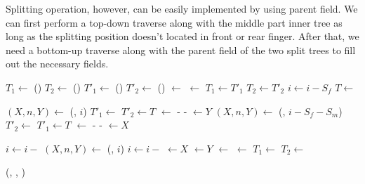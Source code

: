 \documentclass[b5paper]{article}
\begin{document}
Splitting operation, however, can be easily implemented by using parent field. We can first
perform a top-down traverse along with the middle part inner tree as long as the splitting position
doesn't located in front or rear finger. After that, we need a bottom-up traverse along
with the parent field of the two split trees to fill out the necessary fields.

\begin{algorithmic}
  \State $T_1 \gets$ ()
  \State $T_2 \gets$ ()
   
    \State $T'_1 \gets$ ()
    \State $T'_2 \gets$ ()
    \State {} $\gets$ 
    \State {} $\gets$ 
    \State {}
    \State {}
    \State $T_1 \gets T'_1$
    \State $T_2 \gets T'_2$
    \State $i \gets i - S_f$
    \State $T \gets$ 
  \EndWhile

    \State $(X, n, Y) \gets$ (, $i$)
    \State $T'_1 \gets$ 
    \State $T'_2 \gets T$
    \State {} $\gets$  -  - 
    \State {} $\gets Y$
    \State $(X, n, Y) \gets$ (, $i - S_f - S_m$)
    \State $T'_2 \gets$ 
    \State $T'_1 \gets T$
    \State {} $\gets$  -  - 
    \State {} $\gets X$
  \EndIf
  \State {}
  \State {}

  \State $i \gets i -$ 
   
    \State $(X, n, Y) \gets$ (, $i$)
    \State $i \gets i -$ 
    \State {} $\gets X$
    \State {} $\gets Y$
    \State {} $\gets$ 
    \State {} $\gets$ 
    \State $T_1 \gets$ 
    \State $T_2 \gets$ 
  \EndWhile

  \State \Return (, , )
\EndFunction
\end{algorithmic}
\end{document}
